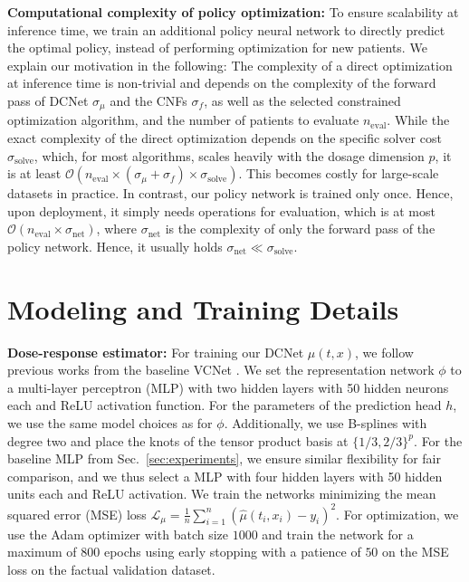 \textbf{Computational complexity of policy optimization:} To ensure scalability at inference time, we train an additional policy neural network to directly predict the optimal policy, instead of performing optimization for new patients. We explain our motivation in the following:
The complexity of a direct optimization at inference time is non-trivial and depends on the complexity of the forward pass of DCNet $\sigma_{\mu}$ and the CNFs $\sigma_{f}$, as well as the selected constrained optimization algorithm, and the number of patients to evaluate $n_\mathrm{eval}$. While the exact complexity of the direct optimization depends on the specific solver cost $\sigma_\mathrm{solve}$, which, for most algorithms, scales heavily with the dosage dimension $p$, it is at least $\mathcal{O}\left(n_\mathrm{eval} \times (\sigma_{\mu} + \sigma_{f}) \times \sigma_\mathrm{solve}\right)$. This becomes costly for large-scale datasets in practice. In contrast, our policy network is trained only once. Hence, upon deployment, it simply needs operations for evaluation, which is at most  $\mathcal{O}(n_\mathrm{eval} \times \sigma_\mathrm{net})$, where $\sigma_\mathrm{net}$ is the complexity of only the forward pass of the policy network. Hence, it usually holds $\sigma_\mathrm{net} \ll \sigma_\mathrm{solve}$. 

\clearpage

\section{Modeling and Training Details} \label{sec:appendix_training}

\textbf{Dose-response estimator:} For training our DCNet $\hat{\mu}(t, x)$, we follow previous works from the baseline VCNet \cite{Bellot.2022,Nie.2021}. We set the representation network $\phi$ to a multi-layer perceptron (MLP) with two hidden layers with 50 hidden neurons each and ReLU activation function. For the parameters of the prediction head $h$, we use the same model choices as for $\phi$. Additionally, we use B-splines with degree two and place the knots of the tensor product basis at $\{ 1/3, 2/3\}^p$. For the baseline MLP from Sec.~\ref{sec:experiments}, we ensure similar flexibility for fair comparison, and we thus select a MLP with four hidden layers with 50 hidden units each and ReLU activation. We train the networks minimizing the mean squared error (MSE) loss $\mathcal{L}_{\mu}=\frac{1}{n}\sum_{i=1}^n \left( \hat{\mu}(t_i, x_i) - y_i \right)^2$. For optimization, we use the Adam optimizer \cite{Kingma.2015} with batch size $1000$ and train the network for a maximum of 800 epochs using early stopping with a patience of $50$ on the MSE loss on the factual validation dataset.

